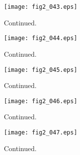 \documentclass[preprint]{aastex}
\begin{document}
\setcounter{figure}{1}
\begin{figure}[t]
\centering
\texttt{[image: fig2\_043.eps]}
\caption{
Continued. 
}
\label{Fig2}
\end{figure}
\clearpage



\setcounter{figure}{1}
\begin{figure}[t]
\centering
\texttt{[image: fig2\_044.eps]}
\caption{
Continued. 
}
\label{Fig2}
\end{figure}
\clearpage



\setcounter{figure}{1}
\begin{figure}[t]
\centering
\texttt{[image: fig2\_045.eps]}
\caption{
Continued. 
}
\label{Fig2}
\end{figure}
\clearpage



\setcounter{figure}{1}
\begin{figure}[t]
\centering
\texttt{[image: fig2\_046.eps]}
\caption{
Continued. 
}
\label{Fig2}
\end{figure}
\clearpage



\setcounter{figure}{1}
\begin{figure}[t]
\centering
\texttt{[image: fig2\_047.eps]}
\caption{
Continued. 
}
\label{Fig2}
\end{figure}
\clearpage
\end{document}
